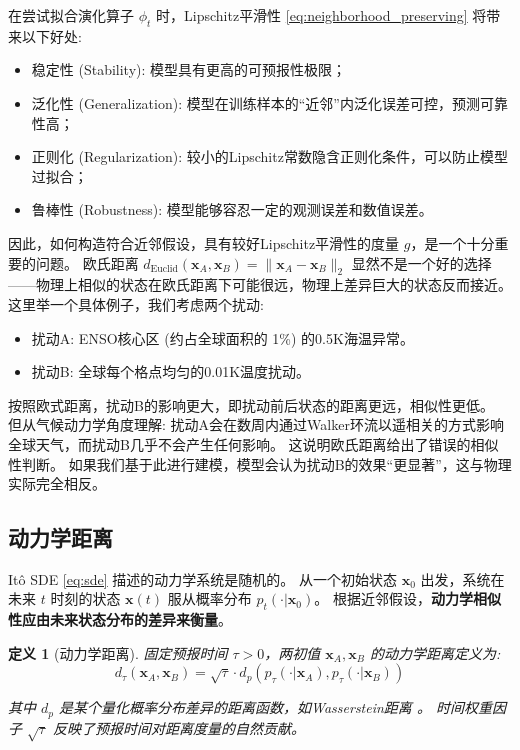 \documentclass[12pt, a4paper]{article}
\newtheorem{definition}{定义}[section]
\newcommand{\metric}{g}
\newcommand{\fastvar}{\bm{x}}          %
\newcommand{\predtime}{\tau}      %
\newcommand{\probdens}{p}           %
\newcommand{\dyndist}{d}                %
\newcommand{\evolop}{\phi}              %
\begin{document}
在尝试拟合演化算子 $\evolop_t$ 时，Lipschitz平滑性 \eqref{eq:neighborhood_preserving} 将带来以下好处:
\begin{itemize}
    \item 稳定性 (Stability): 模型具有更高的可预报性极限；
    \item 泛化性 (Generalization): 模型在训练样本的“近邻”内泛化误差可控，预测可靠性高；
    \item 正则化 (Regularization): 较小的Lipschitz常数隐含正则化条件，可以防止模型过拟合；
    \item 鲁棒性 (Robustness): 模型能够容忍一定的观测误差和数值误差。
\end{itemize}

因此，如何构造符合近邻假设，具有较好Lipschitz平滑性的度量 $\metric$，是一个十分重要的问题。
欧氏距离 $\dyndist_{\text{Euclid}}(\fastvar_A, \fastvar_B) = \|\fastvar_A - \fastvar_B\|_2$ 显然不是一个好的选择——物理上相似的状态在欧氏距离下可能很远，物理上差异巨大的状态反而接近。
这里举一个具体例子，我们考虑两个扰动:
\begin{itemize}
    \item 扰动A: ENSO核心区 (约占全球面积的 1\%) 的0.5K海温异常。
    \item 扰动B: 全球每个格点均匀的0.01K温度扰动。
\end{itemize}

按照欧式距离，扰动B的影响更大，即扰动前后状态的距离更远，相似性更低。
但从气候动力学角度理解: 扰动A会在数周内通过Walker环流以遥相关的方式影响全球天气，而扰动B几乎不会产生任何影响。
这说明欧氏距离给出了错误的相似性判断。
如果我们基于此进行建模，模型会认为扰动B的效果“更显著”，这与物理实际完全相反。

\subsection{动力学距离}

Itô SDE \eqref{eq:sde} 描述的动力学系统是随机的。
从一个初始状态 $\fastvar_0$ 出发，系统在未来 $t$ 时刻的状态 $\fastvar(t)$ 服从概率分布 $\probdens_t(\cdot | \fastvar_0)$。
根据近邻假设，\textbf{动力学相似性应由未来状态分布的差异来衡量}。

\begin{definition}[动力学距离]
\label{def:tau_distance}
    固定预报时间 $\predtime > 0$，两初值 $\fastvar_A, \fastvar_B$ 的动力学距离定义为:
    \begin{equation}
    \label{eq:tau_distance}
        \dyndist_{\predtime}(\fastvar_A, \fastvar_B) = \sqrt{\predtime} \cdot d_p(\probdens_{\predtime}(\cdot | \fastvar_A), \probdens_{\predtime}(\cdot | \fastvar_B))
    \end{equation}

    其中 $d_p$ 是某个量化概率分布差异的距离函数，如Wasserstein距离 \cite{villani2009optimal}。
    时间权重因子 $\sqrt{\predtime}$ 反映了预报时间对距离度量的自然贡献。
\end{definition}
\end{document}
